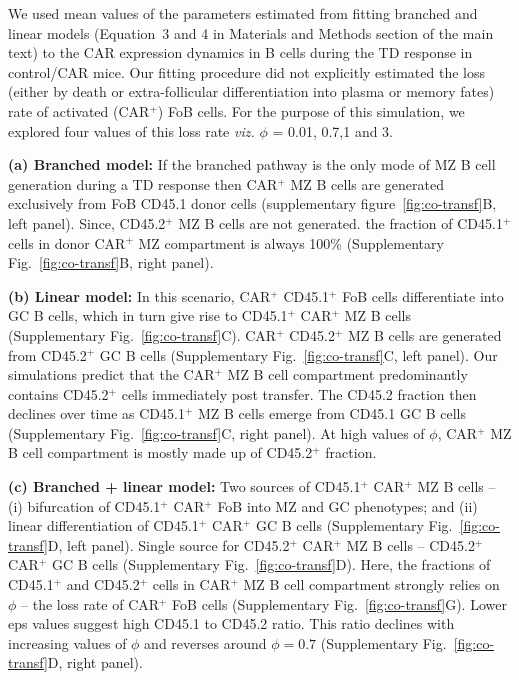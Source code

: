 \documentclass[11pt]{article}
\begin{document}
We used mean values of the parameters estimated from fitting branched and linear models (Equation~3 and 4 in Materials and Methods section of the main text) to the CAR expression dynamics in B cells during the TD response in control/CAR mice.
Our fitting procedure did not explicitly estimated the loss (either by death or extra-follicular differentiation into plasma or memory fates) rate of activated (CAR$^{+}$) FoB cells.
For the purpose of this simulation, we explored four values of this loss rate \textit{viz.} $\phi$ = 0.01, 0.7,1 and 3.


\textbf{(a) Branched model:}
If the branched pathway is the only mode of MZ B cell generation during a TD response then 
CAR$^{+}$  MZ B cells are generated exclusively from FoB CD45.1 donor cells (supplementary figure~\ref{fig:co-transf}B, left panel).
Since, CD45.2$^{+}$ MZ B cells are not generated.%
the fraction of CD45.1$^{+}$ cells in donor CAR$^{+}$ MZ compartment is always 100\% (Supplementary Fig.~\ref{fig:co-transf}B, right panel).

\textbf{(b) Linear model:}
In this scenario, CAR$^{+}$ CD45.1$^{+}$ FoB cells differentiate into GC B cells, which in turn give rise to CD45.1$^{+}$ CAR$^{+}$ MZ B cells (Supplementary Fig.~\ref{fig:co-transf}C). 
CAR$^{+}$ CD45.2$^{+}$ MZ B cells are generated from CD45.2$^{+}$ GC B cells (Supplementary Fig.~\ref{fig:co-transf}C, left panel).
Our simulations predict that the CAR$^{+}$ MZ B cell compartment predominantly contains CD45.2$^{+}$ cells immediately post transfer.
The CD45.2 fraction then declines over time as CD45.1$^{+}$ MZ B cells emerge from CD45.1 GC B cells (Supplementary Fig.~\ref{fig:co-transf}C, right panel).
At high values of $\phi$, CAR$^{+}$ MZ B cell compartment is mostly made up of CD45.2$^{+}$ fraction. 

\textbf{(c) Branched + linear model:}
Two sources of CD45.1$^{+}$ CAR$^{+}$ MZ B cells -- (i) bifurcation of CD45.1$^{+}$ CAR$^{+}$ FoB into MZ and GC phenotypes; and (ii)
linear differentiation of CD45.1$^{+}$ CAR$^{+}$ GC B cells (Supplementary Fig.~\ref{fig:co-transf}D, left panel). 
Single source for CD45.2$^{+}$ CAR$^{+}$  MZ B cells -- CD45.2$^{+}$ CAR$^{+}$ GC B cells (Supplementary Fig.~\ref{fig:co-transf}D).
Here, the fractions of CD45.1$^{+}$ and CD45.2$^{+}$ cells in CAR$^{+}$ MZ B cell compartment strongly relies on $\phi$ -- the loss rate of CAR$^{+}$ FoB cells (Supplementary Fig.~\ref{fig:co-transf}G).
Lower eps values suggest high CD45.1 to CD45.2 ratio. This ratio declines with increasing values of $\phi$ and reverses around $\phi = 0.7$ (Supplementary Fig.~\ref{fig:co-transf}D, right panel).
\end{document}
